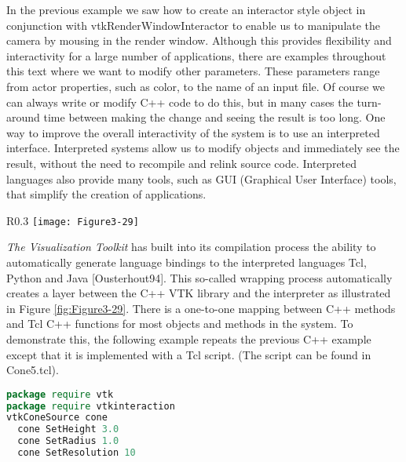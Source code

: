 \begin{description}[leftmargin=0cm,labelindent=0cm]
\item[Interpreted Code.]
\label{subsec:examples_interpreted_code}

In the previous example we saw how to create an interactor style object in conjunction with vtkRenderWindowInteractor to enable us to manipulate the camera by mousing in the render window. Although this provides flexibility and interactivity for a large number of applications, there are examples throughout this text where we want to modify other parameters. These parameters range from actor properties, such as color, to the name of an input file. Of course we can always write or modify C++ code to do this, but in many cases the turn-around time between making the change and seeing the result is too long. One way to improve the overall interactivity of the system is to use an interpreted interface. Interpreted systems allow us to modify objects and immediately see the result, without the need to recompile and relink source code. Interpreted languages also provide many tools, such as GUI (Graphical User Interface) tools, that simplify the creation of applications.

\begin{wrapfigure}{R}{0.3\linewidth}
  \centering
  \texttt{[image: Figure3-29]}\\
  \caption{In VTK the C++ library is automatically wrapped with the interpreted languages Tcl, Python, and Java.}\label{fig:Figure3-29}
\end{wrapfigure}

\emph{The Visualization Toolkit} has built into its compilation process the ability to automatically generate language bindings to the interpreted languages Tcl, Python and Java [Ousterhout94]. This so-called wrapping process automatically creates a layer between the C++ VTK library and the interpreter as illustrated in Figure \ref{fig:Figure3-29}. There is a one-to-one mapping between C++ methods and Tcl C++ functions for most objects and methods in the system. To demonstrate this, the following example repeats the previous C++ example except that it is implemented with a Tcl script. (The script can be found in Cone5.tcl).

\begin{lstlisting}[language=TCL, caption={Cone5.tcl}]
package require vtk
package require vtkinteraction
vtkConeSource cone
  cone SetHeight 3.0
  cone SetRadius 1.0
  cone SetResolution 10


\end{lstlisting}
\end{description}
